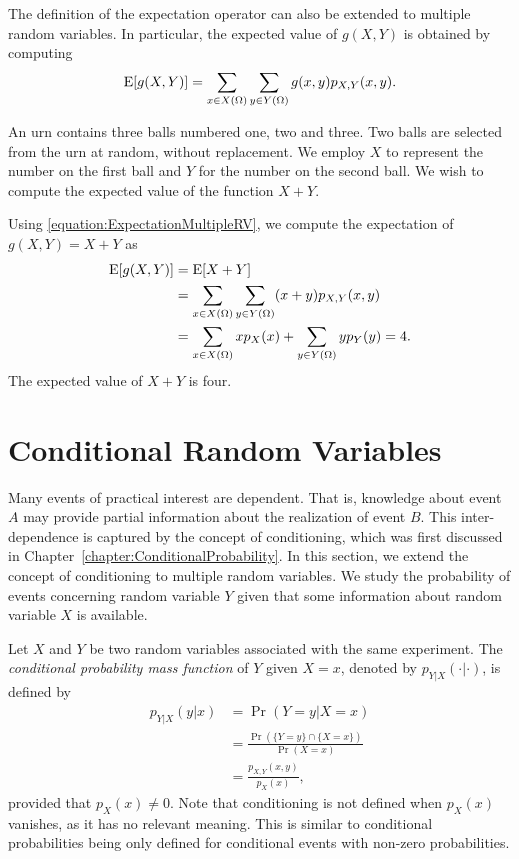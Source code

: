 The definition of the expectation operator can also be extended to multiple random variables.
In particular, the expected value of $g(X,Y)$ is obtained by computing
\begin{equation} \label{equation:ExpectationMultipleRV}
\mathrm{E} [g(X,Y)] = \sum_{x \in X(\Omega)} \sum_{y \in Y(\Omega)} g(x,y) p_{X,Y} (x,y) .
\end{equation}

\begin{example}
An urn contains three balls numbered one, two and three.
Two balls are selected from the urn at random, without replacement.
We employ $X$ to represent the number on the first ball and $Y$ for the number on the second ball.
We wish to compute the expected value of the function $X + Y$.

Using \eqref{equation:ExpectationMultipleRV}, we compute the expectation of $g(X,Y) = X + Y$ as
\begin{equation*}
\begin{split}
\mathrm{E} [g(X,Y)] &= \mathrm{E} [X + Y] \\
&= \sum_{x \in X(\Omega)} \sum_{y \in Y(\Omega)} (x + y) p_{X,Y} (x,y) \\
&= \sum_{x \in X(\Omega)} x p_X (x) + \sum_{y \in Y(\Omega)} y p_Y (y)
= 4.
\end{split}
\end{equation*}
The expected value of $X + Y$ is four.
\end{example}


\section{Conditional Random Variables}
\label{section:ConditionalRandomVariables}

Many events of practical interest are dependent.
That is, knowledge about event $A$ may provide partial information about the realization of event $B$.
This inter-dependence is captured by the concept of conditioning, which was first discussed in Chapter~\ref{chapter:ConditionalProbability}.
In this section, we extend the concept of conditioning to multiple random variables.
We study the probability of events concerning random variable $Y$ given that some information about random variable $X$ is available.

Let $X$ and $Y$ be two random variables associated with the same experiment.
The \emph{conditional probability mass function} of $Y$ given $X = x$, denoted by $p_{Y|X} (\cdot | \cdot)$, is defined by 
\begin{equation*}
\begin{split}
p_{Y|X} (y|x) &= \Pr ( Y = y | X = x) \\
&= \frac{\Pr (\{Y = y\} \cap \{ X = x \})}{\Pr (X = x)} \\
&= \frac{ p_{X,Y} (x,y) }{p_X(x)},
\end{split}
\end{equation*}
provided that $p_X (x) \neq 0$.
Note that conditioning is not defined when $p_X (x)$ vanishes, as it has no relevant meaning.
This is similar to conditional probabilities being only defined for conditional events with non-zero probabilities.

